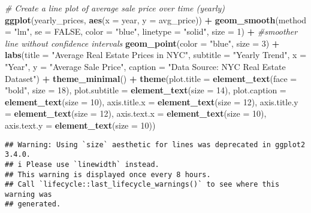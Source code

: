 \documentclass[
]{article}
\newenvironment{Shaded}{\begin{snugshade}}{\end{snugshade}}
\newcommand{\AttributeTok}[1]{\textcolor[rgb]{0.13,0.29,0.53}{#1}}
\newcommand{\CommentTok}[1]{\textcolor[rgb]{0.56,0.35,0.01}{\textit{#1}}}
\newcommand{\ConstantTok}[1]{\textcolor[rgb]{0.56,0.35,0.01}{#1}}
\newcommand{\DecValTok}[1]{\textcolor[rgb]{0.00,0.00,0.81}{#1}}
\newcommand{\FunctionTok}[1]{\textcolor[rgb]{0.13,0.29,0.53}{\textbf{#1}}}
\newcommand{\NormalTok}[1]{#1}
\newcommand{\SpecialCharTok}[1]{\textcolor[rgb]{0.81,0.36,0.00}{\textbf{#1}}}
\newcommand{\StringTok}[1]{\textcolor[rgb]{0.31,0.60,0.02}{#1}}
\begin{document}
\begin{Shaded}
\begin{Highlighting}[]
\CommentTok{\# Create a line plot of average sale price over time (yearly)}
\FunctionTok{ggplot}\NormalTok{(yearly\_prices, }\FunctionTok{aes}\NormalTok{(}\AttributeTok{x =}\NormalTok{ year, }\AttributeTok{y =}\NormalTok{ avg\_price)) }\SpecialCharTok{+}
  \FunctionTok{geom\_smooth}\NormalTok{(}\AttributeTok{method =} \StringTok{"lm"}\NormalTok{, }\AttributeTok{se =} \ConstantTok{FALSE}\NormalTok{, }\AttributeTok{color =} \StringTok{"blue"}\NormalTok{, }\AttributeTok{linetype =} \StringTok{"solid"}\NormalTok{, }\AttributeTok{size =} \DecValTok{1}\NormalTok{) }\SpecialCharTok{+}  \CommentTok{\#smoother line without confidence intervals}
  \FunctionTok{geom\_point}\NormalTok{(}\AttributeTok{color =} \StringTok{"blue"}\NormalTok{, }\AttributeTok{size =} \DecValTok{3}\NormalTok{) }\SpecialCharTok{+}  
  \FunctionTok{labs}\NormalTok{(}\AttributeTok{title =} \StringTok{"Average Real Estate Prices in NYC"}\NormalTok{,}
       \AttributeTok{subtitle =} \StringTok{"Yearly Trend"}\NormalTok{,}
       \AttributeTok{x =} \StringTok{"Year"}\NormalTok{,}
       \AttributeTok{y =} \StringTok{"Average Sale Price"}\NormalTok{,}
       \AttributeTok{caption =} \StringTok{"Data Source: NYC Real Estate Dataset"}\NormalTok{) }\SpecialCharTok{+}
  \FunctionTok{theme\_minimal}\NormalTok{() }\SpecialCharTok{+}  
  \FunctionTok{theme}\NormalTok{(}\AttributeTok{plot.title =} \FunctionTok{element\_text}\NormalTok{(}\AttributeTok{face =} \StringTok{"bold"}\NormalTok{, }\AttributeTok{size =} \DecValTok{18}\NormalTok{),}
        \AttributeTok{plot.subtitle =} \FunctionTok{element\_text}\NormalTok{(}\AttributeTok{size =} \DecValTok{14}\NormalTok{),}
        \AttributeTok{plot.caption =} \FunctionTok{element\_text}\NormalTok{(}\AttributeTok{size =} \DecValTok{10}\NormalTok{),}
        \AttributeTok{axis.title.x =} \FunctionTok{element\_text}\NormalTok{(}\AttributeTok{size =} \DecValTok{12}\NormalTok{),}
        \AttributeTok{axis.title.y =} \FunctionTok{element\_text}\NormalTok{(}\AttributeTok{size =} \DecValTok{12}\NormalTok{),}
        \AttributeTok{axis.text.x =} \FunctionTok{element\_text}\NormalTok{(}\AttributeTok{size =} \DecValTok{10}\NormalTok{),}
        \AttributeTok{axis.text.y =} \FunctionTok{element\_text}\NormalTok{(}\AttributeTok{size =} \DecValTok{10}\NormalTok{))  }
\end{Highlighting}
\end{Shaded}

\begin{verbatim}
## Warning: Using `size` aesthetic for lines was deprecated in ggplot2 3.4.0.
## i Please use `linewidth` instead.
## This warning is displayed once every 8 hours.
## Call `lifecycle::last_lifecycle_warnings()` to see where this warning was
## generated.
\end{verbatim}
\end{document}
